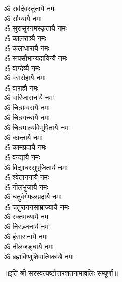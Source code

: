 \begin{multicols}{2}
\begin{flushleft}
ॐ सर्वदेवस्तुतायै नमः\\
ॐ सौम्यायै नमः\\
ॐ सुरासुरनमस्कृतायै नमः\\
ॐ कालरात्र्यै नमः\\
ॐ कलाधारायै नमः\\
ॐ रूपसौभाग्यदायिन्यै नमः\\
ॐ वाग्देव्यै नमः\\
ॐ वरारोहायै नमः\hfill{}\\
ॐ वाराह्यै नमः\\
ॐ वारिजासनायै नमः\\
ॐ चित्राम्बरायै नमः\\
ॐ चित्रगन्धायै नमः\\
ॐ चित्रमाल्यविभूषितायै नमः\\
ॐ कान्तायै नमः\\
ॐ कामप्रदायै नमः\\
ॐ वन्द्यायै नमः\\
ॐ विद्याधरसुपूजितायै नमः\\
ॐ श्वेताननायै नमः\hfill{}\\
ॐ नीलभुजायै नमः\\
ॐ चतुर्वर्गफलप्रदायै नमः\\
ॐ चतुराननसाम्राज्यायै नमः\\
ॐ रक्तमध्यायै नमः\\
ॐ निरञ्जनायै नमः\\
ॐ हंसासनायै नमः\\
ॐ नीलजङ्घायै नमः\\
ॐ ब्रह्मविष्णुशिवात्मिकायै नमः\\
\end{flushleft}
\end{multicols}
\centerline{॥इति श्री सरस्वत्यष्टोत्तरशतनामावलिः सम्पूर्णा॥}

